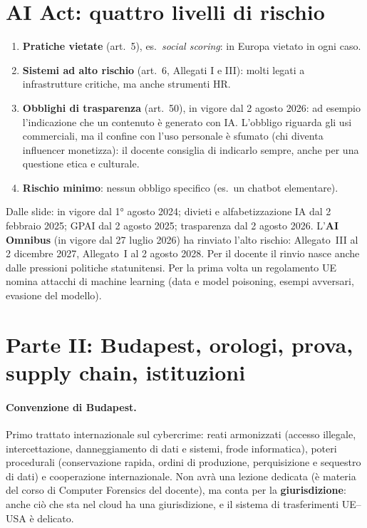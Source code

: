 \section{AI Act: quattro livelli di rischio}
\begin{enumerate}
  \item \textbf{Pratiche vietate} (art.~5), es.\ \emph{social scoring}: in Europa vietato in ogni caso.
  \item \textbf{Sistemi ad alto rischio} (art.~6, Allegati I e III): molti legati a infrastrutture
    critiche, ma anche strumenti HR.
  \item \textbf{Obblighi di trasparenza} (art.~50), in vigore dal 2 agosto 2026: ad esempio
    l'indicazione che un contenuto è generato con IA. L'obbligo riguarda gli usi commerciali, ma il
    confine con l'uso personale è sfumato (chi diventa influencer monetizza): il docente consiglia di
    indicarlo sempre, anche per una questione etica e culturale.
  \item \textbf{Rischio minimo}: nessun obbligo specifico (es.\ un chatbot elementare).
\end{enumerate}
Dalle slide: in vigore dal 1° agosto 2024; divieti e alfabetizzazione IA dal 2 febbraio 2025; GPAI dal
2 agosto 2025; trasparenza dal 2 agosto 2026. L'\textbf{AI Omnibus} (in vigore dal 27 luglio 2026)
ha rinviato l'alto rischio: Allegato~III al 2 dicembre 2027, Allegato~I al 2 agosto 2028. Per il
docente il rinvio nasce anche dalle pressioni politiche statunitensi. Per la prima volta un
regolamento UE nomina attacchi di machine learning (data e model poisoning, esempi avversari,
evasione del modello).

\section{Parte II: Budapest, orologi, prova, supply chain, istituzioni}

\paragraph{Convenzione di Budapest.} Primo trattato internazionale sul cybercrime: reati armonizzati
(accesso illegale, intercettazione, danneggiamento di dati e sistemi, frode informatica), poteri
procedurali (conservazione rapida, ordini di produzione, perquisizione e sequestro di dati) e
cooperazione internazionale. Non avrà una lezione dedicata (è materia del corso di Computer Forensics
del docente), ma conta per la \textbf{giurisdizione}: anche ciò che sta nel cloud ha una
giurisdizione, e il sistema di trasferimenti UE--USA è delicato.

